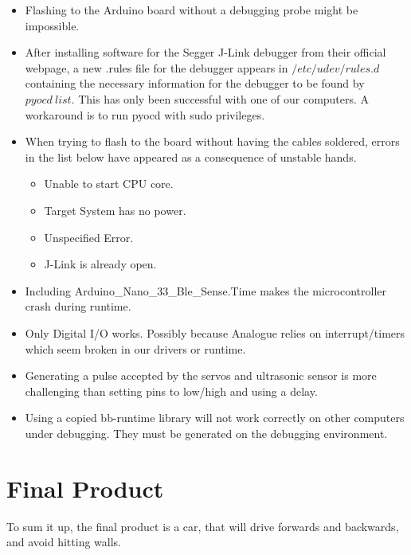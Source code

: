 \documentclass{article}
\begin{document}
\begin{itemize}
	\item Flashing to the Arduino board without a debugging probe might be impossible.

	\item After installing software for the Segger J-Link debugger from their official webpage, a new .rules file for the debugger appears in $/etc/udev/rules.d$ containing the necessary information for the debugger to be found by $pyocd\ list$. This has only been successful with one of our computers. A workaround is to run pyocd with sudo privileges.

	\item When trying to flash to the board without having the cables soldered, errors in the list below have appeared as a consequence of unstable hands.
		\begin{itemize}
			\item Unable to start CPU core.
			\item Target System has no power.
            \item Unspecified Error.
            \item J-Link is already open.
		\end{itemize}

	\item Including Arduino\_Nano\_33\_Ble\_Sense.Time makes the microcontroller crash during runtime.

	\item Only Digital I/O works. Possibly because Analogue relies on interrupt/timers which seem broken in our drivers or runtime.

	\item Generating a pulse accepted by the servos and ultrasonic sensor is more challenging than setting pins to low/high and using a delay.

	\item Using a copied bb-runtime library will not work correctly on other computers under debugging. They must be generated on the debugging environment.

\end{itemize}

\section{Final Product}
To sum it up, the final product is a car, that will drive forwards and backwards, and avoid hitting walls.
\end{document}
